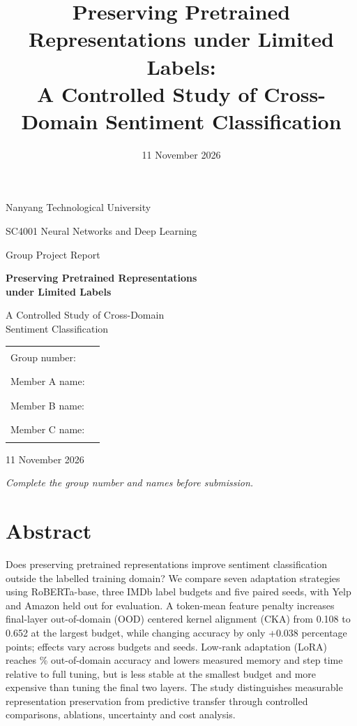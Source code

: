 \documentclass[a4paper,10pt]{article}
\title{Preserving Pretrained Representations under Limited Labels:\\A Controlled Study of Cross-Domain Sentiment Classification}
\author{}
\date{11 November 2026}
\begin{document}
\hypersetup{pageanchor=false}
\begin{titlepage}
\centering
{\large Nanyang Technological University\par}
\vspace{10mm}
{\large SC4001 Neural Networks and Deep Learning\par}
{\large Group Project Report\par}
\vspace{23mm}
{\LARGE\bfseries Preserving Pretrained Representations\\[3mm] under Limited Labels\par}
\vspace{6mm}
{\Large A Controlled Study of Cross-Domain\\ Sentiment Classification\par}
\vspace{22mm}
\begin{tabular}{ll}
Group number: & \rule{75mm}{0.4pt}\\[8mm]
Member A name: & \rule{75mm}{0.4pt}\\[8mm]
Member B name: & \rule{75mm}{0.4pt}\\[8mm]
Member C name: & \rule{75mm}{0.4pt}
\end{tabular}
\vfill
11 November 2026\par
\vspace{4mm}
\textit{Complete the group number and names before submission.}\par
\end{titlepage}
\setcounter{page}{1}
\hypersetup{pageanchor=true}
\label{mainstart}
\section*{Abstract}
Does preserving pretrained representations improve sentiment classification outside the labelled training domain? We compare seven adaptation strategies using RoBERTa-base, three IMDb label budgets and five paired seeds, with Yelp and Amazon held out for evaluation. A token-mean feature penalty increases final-layer out-of-domain (OOD) centered kernel alignment (CKA) from 0.108 to 0.652 at the largest budget, while changing accuracy by only +0.038 percentage points; effects vary across budgets and seeds. Low-rank adaptation (LoRA) reaches \OODLoRAHigh\% out-of-domain accuracy and lowers measured memory and step time relative to full tuning, but is less stable at the smallest budget and more expensive than tuning the final two layers. The study distinguishes measurable representation preservation from predictive transfer through controlled comparisons, ablations, uncertainty and cost analysis.
\end{document}
